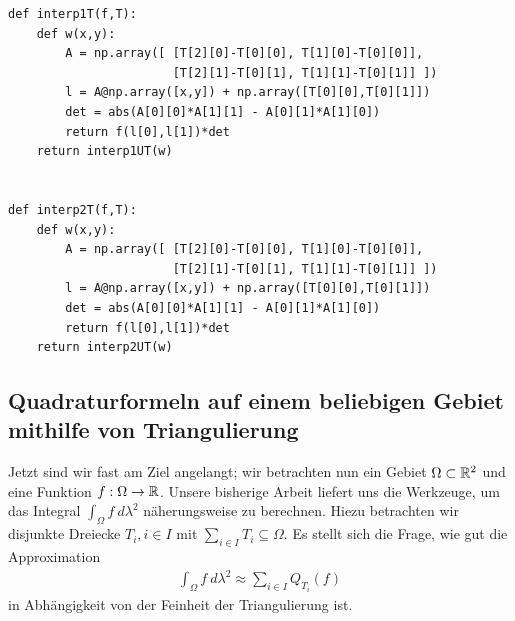 \lstset{language=Python}
\lstset{frame=lines}
\lstset{basicstyle=\footnotesize}
\newpage
\begin{lstlisting}
def interp1T(f,T):
    def w(x,y):
        A = np.array([ [T[2][0]-T[0][0], T[1][0]-T[0][0]],
                       [T[2][1]-T[0][1], T[1][1]-T[0][1]] ])
        l = A@np.array([x,y]) + np.array([T[0][0],T[0][1]])
        det = abs(A[0][0]*A[1][1] - A[0][1]*A[1][0])
        return f(l[0],l[1])*det
    return interp1UT(w)


def interp2T(f,T):
    def w(x,y):
        A = np.array([ [T[2][0]-T[0][0], T[1][0]-T[0][0]],
                       [T[2][1]-T[0][1], T[1][1]-T[0][1]] ])
        l = A@np.array([x,y]) + np.array([T[0][0],T[0][1]])
        det = abs(A[0][0]*A[1][1] - A[0][1]*A[1][0])
        return f(l[0],l[1])*det
    return interp2UT(w)
\end{lstlisting}
\subsection{Quadraturformeln auf einem beliebigen Gebiet mithilfe von Triangulierung}
Jetzt sind wir fast am Ziel angelangt; wir betrachten nun ein Gebiet $\Omega \subset \mathbb{R}^2$ und eine Funktion $f : \Omega \to \mathbb{R}$. Unsere bisherige Arbeit liefert uns die Werkzeuge, um das Integral $\int_{\Omega}f~d\lambda^{2}$ näherungsweise zu berechnen. Hiezu betrachten wir disjunkte Dreiecke $T_i, i \in I$ mit $\sum_{i \in I}{T_i} \subseteq \Omega$. Es stellt sich die Frage, wie gut die Approximation
\begin{align*}
    \int_{\Omega}f~d\lambda^{2} \approx \sum_{i \in I}{Q_{T_{i}}(f)}
\end{align*}
in Abhängigkeit von der Feinheit der Triangulierung ist.\newline

